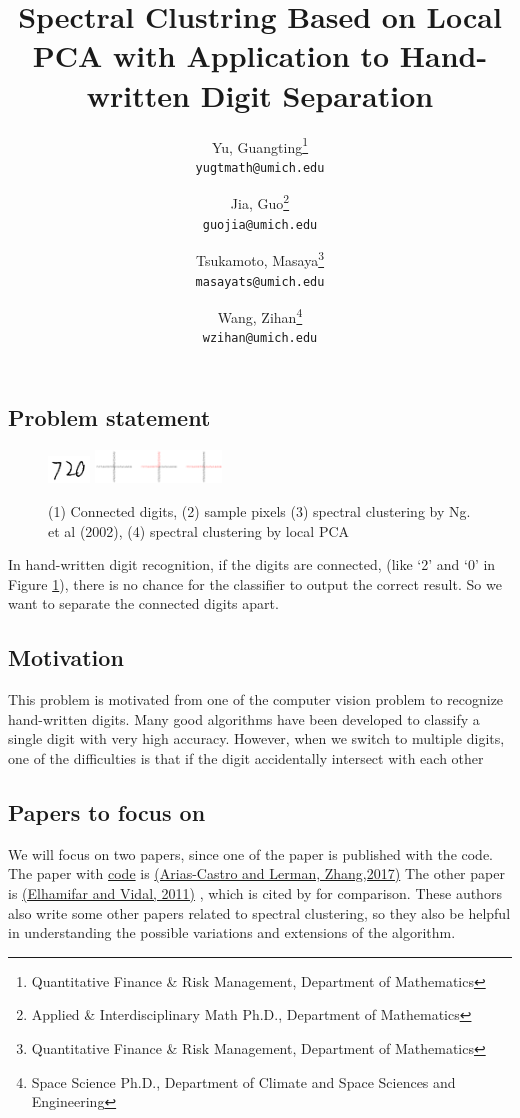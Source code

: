 \documentclass[10pt,twocolumn]{article}
\title{\large{Spectral Clustring Based on Local PCA with Application to Hand-written Digit Separation}}
\author{
    Yu, Guangting\thanks{Quantitative Finance \& Risk Management, Department of Mathematics} \\
    \small{\texttt{yugtmath@umich.edu}}
    \and
    Jia, Guo\thanks{Applied \& Interdisciplinary Math Ph.D., Department of Mathematics} \\
    \texttt{guojia@umich.edu}
    \and
    Tsukamoto, Masaya\thanks{Quantitative Finance \& Risk Management, Department of Mathematics} \\
    \texttt{masayats@umich.edu}
    \and
    Wang, Zihan\thanks{Space Science Ph.D., Department of Climate and Space Sciences and Engineering} \\
    \texttt{wzihan@umich.edu}
}
\begin{document}
\maketitle

\subsection*{Problem statement}
\begin{figure}[htbp]
\centering
\includegraphics[width=0.1\textwidth]{connected-digits.png}
\hspace{1em}
\includegraphics[width=0.3\textwidth]{effect.png}
\caption{(1) Connected digits, (2) sample pixels (3) spectral clustering by Ng. et al (2002), (4) spectral clustering by local PCA}
\label{fig1}
\end{figure}
In hand-written digit recognition, if the digits are connected, (like `2' and `0' in Figure \ref{fig1}), there is no chance for the classifier to output the correct result.
So we want to separate the connected digits apart.
\subsection*{Motivation}
This problem is motivated from one of the computer vision problem to recognize hand-written digits.
Many good algorithms have been developed to classify a single digit with very high accuracy.
However, when we switch to multiple digits, one of the difficulties is that if the digit accidentally intersect with each other
\subsection*{Papers to focus on}
We will focus on two papers, since one of the paper is published with the code.
The paper with \href{http://sciences.ucf.edu/math/tengz/wp-content/uploads/sites/45/2016/07/code.zip}{code} is
\href{http://www.jmlr.org/papers/volume18/14-318/14-318.pdf}{(Arias-Castro and Lerman, Zhang,2017)}
\cite{Arias-Castro:2017:SCB:3122009.3122018}
The other paper is \href{https://papers.nips.cc/paper/4246-sparse-manifold-clustering-and-embedding.pdf}{(Elhamifar and Vidal, 2011)}
\cite{NIPS2011_4246}, which is cited by \cite{Arias-Castro:2017:SCB:3122009.3122018} for comparison.
These authors also write some other papers related to spectral clustering, so they also be helpful in understanding the possible variations and extensions of the algorithm.
\end{document}
